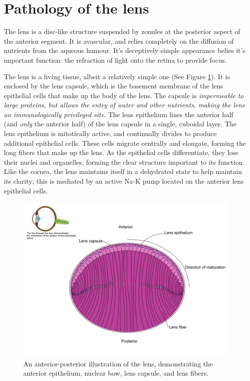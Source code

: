 \documentclass[
  openany]{article}
\begin{document}
\hypertarget{pathology-of-the-lens}{%
\section{Pathology of the lens}\label{pathology-of-the-lens}}

The lens is a disc-like structure suspended by zonules at the posterior aspect of the anterior segment. It is avascular, and relies completely on the diffusion of nutrients from the aqueous humour. It's deceptively simple appearance belies it's important function: the refraction of light onto the retina to provide focus.

The lens is a living tissue, albeit a relatively simple one (See Figure \ref{fig:lens}). It is enclosed by the lens capsule, which is the basement membrane of the lens epithelial cells that make up the body of the lens. The capsule is \emph{impermeable to large proteins, but allows the entry of water and other nutrients, making the lens an immunologically privileged site}. The lens epithelium lines the anterior half (and \emph{only} the anterior half) of the lens capsule in a single, cuboidal layer. The lens epithelium is mitotically active, and continually divides to produce additional epithelial cells. These cells migrate centrally and elongate, forming the long fibers that make up the lens. As the epithelial cells differentiate, they lose their nuclei and organelles, forming the clear structure important to its function. Like the cornea, the lens maintains itself in a dehydrated state to help maintain its clarity; this is mediated by an active Na-K pump located on the anterior lens epithelial cells.

\begin{figure}

{\centering \includegraphics[width=0.6\linewidth]{images/lens3x} 

}

\caption{An anterior-posterior illustration of the lens, demonstrating the anterior epithelium, nuclear bow, lens capsule, and lens fibers.}\label{fig:lens}
\end{figure}
\end{document}
